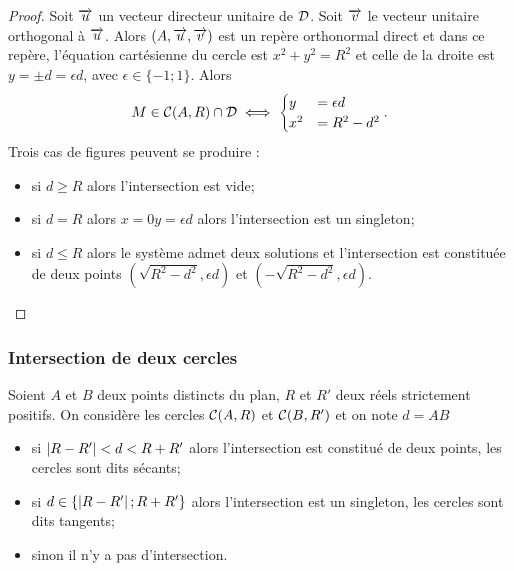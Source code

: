 \begin{proof}
  Soit \(\overrightarrow{u}\) un vecteur directeur unitaire de \(\mathcal{D}\). Soit \(\overrightarrow{v}\) le
  vecteur unitaire orthogonal à \(\overrightarrow{u}\). Alors \((A , \overrightarrow{u} , \overrightarrow{v})\) est un
  repère orthonormal direct et dans ce repère, l'équation cartésienne du
  cercle est \(x^2 + y^2 = R^2\) et celle de la droite est \(y = \pm d =
  \epsilon d\), avec \(\epsilon \in \{-1; 1\}\). Alors
  \begin{equation}
    M \in \mathcal{C}(A,R) \cap \mathcal{D} \iff
    \begin{cases} y& = \epsilon d \\ x^2& =
      R^2 - d^2
    \end{cases}.
  \end{equation}
  Trois cas de figures peuvent se produire :
  \begin{itemize}
    \item si \(d \geqslant R\) alors l'intersection est vide;
    \item si \(d = R\) alors \(x = 0 y = \epsilon d\) alors l'intersection
      est un singleton;
    \item si \(d \leqslant R\) alors le système admet deux solutions et
      l'intersection est constituée de deux points \((\sqrt{R^2 -
      d^2},\epsilon d)\) et \((-\sqrt{R^2 - d^2},\epsilon d)\).
  \end{itemize}
\end{proof}

\subsubsection{Intersection de deux cercles}

\begin{prop}
  Soient \(A\) et \(B\) deux points distincts du plan, \(R\) et \(R'\) deux
  réels strictement positifs. On considère les cercles \(\mathcal{C}(A,R)\) et
  \(\mathcal{C}(B,R')\) et on note \(d = AB\)
  \begin{itemize}
    \item si \(\left\lvert R - R'\right\rvert < d < R + R'\) alors l'intersection est constitué de
      deux points, les cercles sont dits sécants;
    \item si \(d \in \{\left\lvert R - R'\right\rvert ; R + R'\}\) alors l'intersection est un
      singleton, les cercles sont dits tangents;
    \item sinon il n'y a pas d'intersection.
  \end{itemize}
\end{prop}

